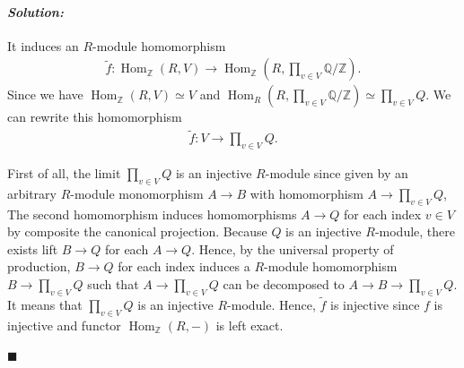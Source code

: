 \documentclass[12pt, a4paper]{article}
\newcommand{\qz}{\mathbb{Q}/\mathbb{Z}}
\newcommand{\z}{\mathbb{Z}}
\renewcommand{\hom}{\operatorname{Hom}}
\theoremstyle{remark}
\newenvironment{solution}
  {\paragraph{\textit{Solution:}}\par\medskip}
  {\hfill$\blacksquare$\vspace{0.1cm}}
\begin{document}
\begin{solution}
    It induces an $R$-module homomorphism 
    \begin{align*}
        \tilde{f}:\hom_\z(R,V) \to \hom_\z(R,\prod_{v\in V}\qz).
    \end{align*}
    Since we have $\hom_\z(R,V)\simeq V$ and $\hom_R(R,\prod_{v\in V}\qz)\simeq \prod_{v\in V} Q$. We can rewrite this homomorphism
    \begin{align*}
        \tilde{f}: V\to \prod_{v\in V} Q.
    \end{align*}

    First of all, the limit $\prod_{v\in V} Q$ is an injective $R$-module since given by an arbitrary $R$-module monomorphism $A \to B$ with homomorphism $A\to \prod_{v\in V} Q$,
    The second homomorphism induces homomorphisms $A\to Q$ for each index $v\in V$ by composite the canonical projection.
    Because $Q$ is an injective $R$-module, there exists lift $B\to Q$ for each $A\to Q$. Hence, by the universal property of production, $B\to Q$ for each index induces a $R$-module homomorphism $B\to \prod_{v\in V} Q$ such that $A\to \prod_{v\in V} Q$
    can be decomposed to $A\to B\to \prod_{v\in V} Q$. It means that $\prod_{v\in V} Q$ is an injective $R$-module.
    Hence, $\tilde{f}$ is injective since $f$ is injective and functor $\hom_\z(R,-)$ is left exact.


\end{solution}
\end{document}
